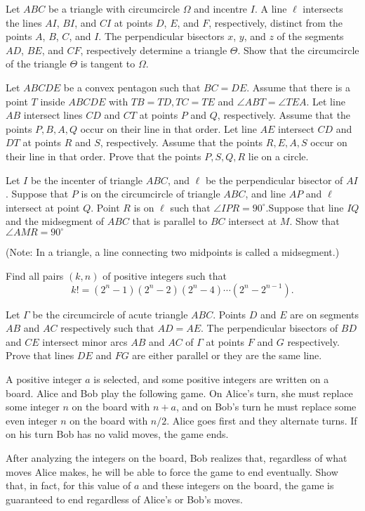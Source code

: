 \documentclass[11pt]{scrartcl}
\begin{document}
\begin{problem}[719467452801051]
Let $ABC$ be a triangle with circumcircle $\Omega$ and incentre $I$. A line $\ell$ intersects the lines $AI$, $BI$, and $CI$ at points $D$, $E$, and $F$, respectively, distinct from the points $A$, $B$, $C$, and $I$. The perpendicular bisectors $x$, $y$, and $z$ of the segments $AD$, $BE$, and $CF$, respectively determine a triangle $\Theta$. Show that the circumcircle of the triangle $\Theta$ is tangent to $\Omega$.
\end{problem}
\begin{problem}[8417327567048605288]
Let $ABCDE$ be a convex pentagon such that $BC=DE$. Assume that there is a point $T$ inside $ABCDE$ with $TB=TD,TC=TE$ and $\angle ABT = \angle TEA$. Let line $AB$ intersect lines $CD$ and $CT$ at points $P$ and $Q$, respectively. Assume that the points $P,B,A,Q$ occur on their line in that order. Let line $AE$ intersect $CD$ and $DT$ at points $R$ and $S$, respectively. Assume that the points $R,E,A,S$ occur on their line in that order. Prove that the points $P,S,Q,R$ lie on a circle.
\end{problem}
\begin{problem}[908587245178389]
Let $I$ be the incenter of triangle $ABC$, and $\ell$ be the perpendicular bisector of $AI$. Suppose that $P$ is on the circumcircle of triangle $ABC$, and line $AP$ and $\ell$ intersect at point $Q$. Point $R$ is on $\ell$ such that $\angle IPR = 90^{\circ}$.Suppose that line $IQ$ and the midsegment of $ABC$ that is parallel to $BC$ intersect at $M$. Show that $\angle AMR = 90^{\circ}$

(Note: In a triangle, a line connecting two midpoints is called a midsegment.)
\end{problem}
\begin{problem}[16776483958513]
Find all pairs $(k,n)$ of positive integers such that\[ k!=(2^n-1)(2^n-2)(2^n-4)\cdots(2^n-2^{n-1}). \]
\end{problem}
\begin{problem}[625002281186392279]
	Let $\Gamma$ be the circumcircle of acute triangle $ABC$. Points $D$ and $E$ are on segments $AB$ and $AC$ respectively such that $AD = AE$. The perpendicular bisectors of $BD$ and $CE$ intersect minor arcs $AB$ and $AC$ of $\Gamma$ at points $F$ and $G$ respectively. Prove that lines $DE$ and $FG$ are either parallel or they are the same line.
\end{problem}
\begin{problem}[1473691226426629581]
A positive integer $a$ is selected, and some positive integers are written on a board. Alice and Bob play the following game. On Alice's turn, she must replace some integer $n$ on the board with $n+a$, and on Bob's turn he must replace some even integer $n$ on the board with $n/2$. Alice goes first and they alternate turns. If on his turn Bob has no valid moves, the game ends.

After analyzing the integers on the board, Bob realizes that, regardless of what moves Alice makes, he will be able to force the game to end eventually. Show that, in fact, for this value of $a$ and these integers on the board, the game is guaranteed to end regardless of Alice's or Bob's moves.
\end{problem}
\end{document}
